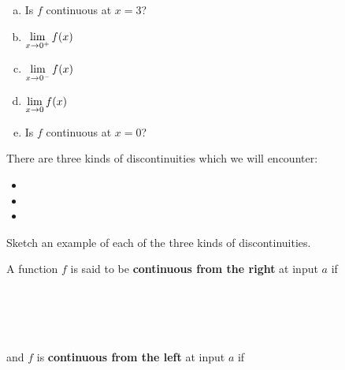 \documentclass[notes]{subfiles}
\begin{document}
\begin{ex}
\begin{minipage}{\textwidth}
\begin{multicols*}{3}
\begin{enumerate}[(a)]
				\item Is $f$ continuous at $x =3 $?\\[50pt]
					\columnbreak
				\item $\displaystyle \lim_{x\to 0^+} f(x)$\\[50pt] 
				\item $\displaystyle \lim_{x\to 0^-} f(x)$\\[50pt]  
				\item $\displaystyle \lim_{x\to 0} f(x)$\\[50pt] 
				\item Is $f$ continuous at $x =0 $?\\[50pt]
			\end{enumerate}
				\raggedcolumns
			\end{multicols*}
		\end{minipage}
		\end{ex}
			\newpage
			
		\begin{rmk}
			There are three kinds of discontinuities which we will encounter:\\[10pt]
			\begin{itemize}
			\setlength\itemsep{15pt}
				\item {}
				\item {}
				\item {}
			\end{itemize}
		\end{rmk}
		
		\begin{ex}
			Sketch an example of each of the three kinds of discontinuities.
		\end{ex}
			
		\begin{defn}
			A function \(f\) is said to be \textbf{continuous from the right} at input \(a\) if

				\\ \\ \\ \\
			
			and \(f\) is \textbf{continuous from the left} at input \(a\) if 

				\\ \\
			
		\end{defn}	
			\newpage
			
\end{document}
